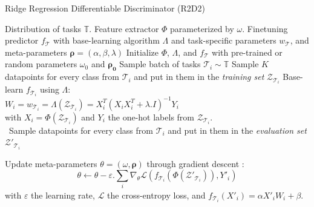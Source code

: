  \begin{algorithm}
 \caption{Ridge Regression Differentiable Discriminator (R2D2)}
 \begin{algorithmic}[1]
 \renewcommand{\algorithmicrequire}{\textbf{Require:}}
 \renewcommand{\algorithmicensure}{\textbf{Require:}}
 \REQUIRE Distribution of tasks $\mathbb{T}$.
 \ENSURE Feature extractor $\Phi$ parameterized by $\omega$.
 \ENSURE Finetuning predictor $f_{\mathcal{T}}$ with base-learning algorithm $\Lambda$ and task-specific parameters $w_\mathcal{T}$, and meta-parameters ${\bm{\rho} = (\alpha, \beta, \lambda)}$
  \STATE Initialize $\Phi$, $\Lambda$, and $f_{\mathcal{T}}$ with pre-trained or random parameters $\omega_0$ and $\bm{\rho_0}$
  \STATE Sample batch of tasks $\mathcal{T}_i \sim \mathbb{T}$
  \STATE Sample $K$ datapoints for every class from $\mathcal{T}_i$ and put in them in the \textit{training set} $\mathcal{Z}_{\mathcal{T}_i}$
  \STATE Base-learn $ f_{\mathcal{T}_i} $ using $\Lambda$:\\ $W_i = w_{\mathcal{T}_i} = \Lambda(\mathcal{Z}_{\mathcal{T}_i}) =  X_i^T(X_iX_i^T+\lambda .I)^{-1}Y_i$ \\with $X_i=\Phi(\mathcal{Z}_{\mathcal{T}_i})$ and $Y_i$ the one-hot labels from $\mathcal{Z}_{\mathcal{T}_i}$.\\\
  \STATE Sample datapoints for every class from $\mathcal{T}_i$ and put in them in the \textit{evaluation set} $\mathcal{Z}'_{\mathcal{T}_i}$


  \ENDFOR
  \STATE Update meta-parameters ${\theta = (\omega, \bm{\rho})}$ through gradient descent : \[\theta \leftarrow \theta - \varepsilon.\sum_{\underset{}{i}} \nabla_\theta \mathcal{L}(f_{\mathcal{T}_i}(\Phi(\mathcal{Z}'_{\mathcal{T}_i})),Y'_i) \] with $\varepsilon$ the learning rate, $\mathcal{L}$ the cross-entropy loss, and $f_{\mathcal{T}_i}(X'_i) = \alpha X'_i W_i + \beta$.
  \ENDWHILE
 \end{algorithmic}
 \label{algo}
 \end{algorithm}

